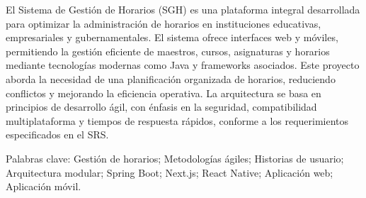 El Sistema de Gestión de Horarios (SGH) es una plataforma integral desarrollada para optimizar la administración de horarios en instituciones educativas, empresariales y gubernamentales. El sistema ofrece interfaces web y móviles, permitiendo la gestión eficiente de maestros, cursos, asignaturas y horarios mediante tecnologías modernas como Java y frameworks asociados. Este proyecto aborda la necesidad de una planificación organizada de horarios, reduciendo conflictos y mejorando la eficiencia operativa. La arquitectura se basa en principios de desarrollo ágil, con énfasis en la seguridad, compatibilidad multiplataforma y tiempos de respuesta rápidos, conforme a los requerimientos especificados en el SRS.

Palabras clave: Gestión de horarios; Metodologías ágiles; Historias de usuario; Arquitectura modular; Spring Boot; Next.js; React Native; Aplicación web; Aplicación móvil.